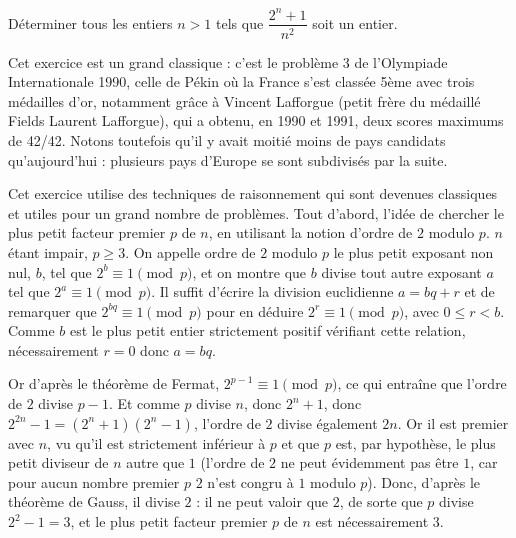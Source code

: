 \bigskip

\begin{exo}

\medskip

Déterminer tous les entiers $n > 1$ tels que $\dfrac{2^n+1}{n^2}$ soit un entier.

\end{exo}


\bigskip

\begin{sol}

\medskip

Cet exercice est un grand classique : c'est le problème 3 de l'Olympiade Internationale 1990, celle de Pékin où la France s'est classée 5ème avec trois médailles d'or, notamment grâce à Vincent Lafforgue (petit frère du médaillé Fields Laurent Lafforgue), qui a obtenu, en 1990 et 1991, deux scores maximums de 42/42. Notons toutefois qu'il y avait moitié moins de pays candidats qu'aujourd'hui : plusieurs pays d'Europe se sont subdivisés par la suite.

Cet exercice utilise des techniques de raisonnement qui sont devenues classiques et utiles pour un grand nombre de problèmes. Tout d'abord, l'idée de chercher le plus petit facteur premier $p$ de $n$, en utilisant la notion d'ordre de $2$ modulo $p$. $n$ étant impair, $p \geq 3$. On appelle ordre de $2$ modulo $p$ le plus petit exposant non nul, $b$, tel que $2^b \equiv 1 \pmod{p}$, et on montre que $b$ divise tout autre exposant $a$ tel que $2^a \equiv 1 \pmod{p}$. Il suffit d'écrire la division euclidienne $a = bq + r$ et de remarquer que $2^{bq} \equiv 1 \pmod{p}$ pour en déduire $2^r \equiv 1 \pmod{p}$, avec $0 \leq r < b$. Comme $b$ est le plus petit entier strictement positif vérifiant cette relation, nécessairement $r = 0$ donc $a = bq$. 

Or d'après le théorème de Fermat, $2^{p-1} \equiv 1 \pmod{p}$, ce qui entraîne que l'ordre de $2$ divise $p-1$. Et comme $p$ divise $n$, donc $2^n+1$, donc $2^{2n}-1 = \left(2^n+1\right)\left(2^n-1\right)$, l'ordre de $2$ divise également $2n$. Or il est premier avec $n$, vu qu'il est strictement inférieur à $p$ et que $p$ est, par hypothèse, le plus petit diviseur de $n$ autre que $1$ (l'ordre de $2$ ne peut évidemment pas être $1$, car pour aucun nombre premier $p$  $2$ n'est congru à $1$ modulo $p$). Donc, d'après le théorème de Gauss, il divise $2$ : il ne peut valoir que $2$, de sorte que $p$ divise $2^2 - 1 = 3$, et le plus petit facteur premier $p$ de $n$ est nécessairement $3$. 


\end{sol}

